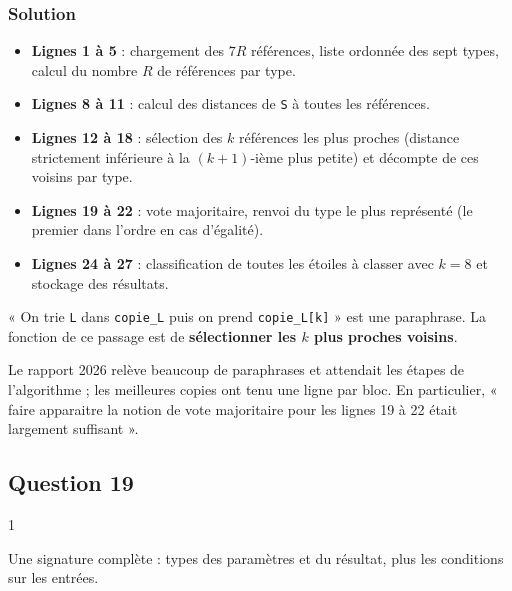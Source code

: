 \documentclass[11pt,a4paper]{article}
\providecommand{\tightlist}{\setlength{\itemsep}{0pt}\setlength{\parskip}{0pt}}
\begin{document}
\hypertarget{solution-17}{%
\subsubsection{Solution}\label{solution-17}}

\begin{itemize}
\tightlist
\item
  \textbf{Lignes 1 à 5} : chargement des \(7R\) références, liste ordonnée des sept types, calcul du nombre \(R\) de références par type.
\item
  \textbf{Lignes 8 à 11} : calcul des distances de \texttt{S} à toutes les références.
\item
  \textbf{Lignes 12 à 18} : sélection des \(k\) références les plus proches (distance strictement inférieure à la \((k+1)\)-ième plus petite) et décompte de ces voisins par type.
\item
  \textbf{Lignes 19 à 22} : vote majoritaire, renvoi du type le plus représenté (le premier dans l'ordre en cas d'égalité).
\item
  \textbf{Lignes 24 à 27} : classification de toutes les étoiles à classer avec \(k = 8\) et stockage des résultats.
\end{itemize}

\begin{piege}

« On trie \texttt{L} dans \texttt{copie\_L} puis on prend \texttt{copie\_L{[}k{]}} » est une paraphrase. La fonction de ce passage est de \textbf{sélectionner les \(k\) plus proches voisins}.

\end{piege}

\begin{jury}

Le rapport 2026 relève beaucoup de paraphrases et attendait les étapes de l'algorithme ; les meilleures copies ont tenu une ligne par bloc. En particulier, « faire apparaitre la notion de vote majoritaire pour les lignes 19 à 22 était largement suffisant ».

\end{jury}

\hypertarget{question-19}{%
\subsection{Question 19}\label{question-19}}

\begin{indication}{1}

Une signature complète : types des paramètres et du résultat, plus les conditions sur les entrées.

\end{indication}
\end{document}
